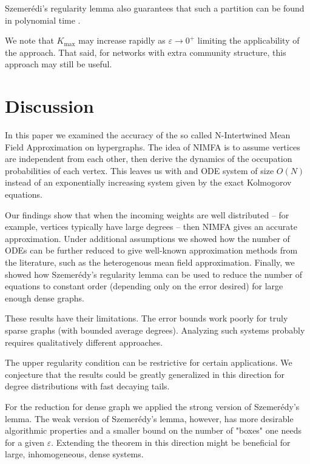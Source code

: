 \documentclass{article}
\newcommand{\1}[1]{{\mathds{1}}_{\left\{#1\right\}}}
\begin{document}
	Szemer\'edi's regularity lemma also guarantees that such a partition can be found in polynomial time \cite{SzemerediAlgorithm}.
	
	We note that $K_{\max}$ may increase rapidly as $\varepsilon \to 0^{+}$  limiting the applicability of the approach. That said, for networks with extra community structure, this approach may still be useful.
	
	\section{Discussion}
	\label{s:Discussion}
	
	
	In this paper we examined the accuracy of the so called N-Intertwined Mean Field Approximation on hypergraphs. The idea of NIMFA is to assume vertices are independent from each other, then derive the dynamics of the occupation probabilities of each vertex. This leaves us with and ODE system of size $O(N)$ instead of an exponentially increasing system given by the exact Kolmogorov equations.  
	
	Our findings show that when the incoming weights are well distributed -- for example, vertices typically have large degrees -- then NIMFA gives an accurate approximation. Under additional assumptions we showed how the number of ODEs can be further reduced to give well-known approximation methods from the literature, such as the heterogenous mean field approximation. Finally, we showed how Szemer\'edy's regularity lemma can be used to reduce the number of equations to constant order (depending only on the error desired) for large enough dense graphs.
	
	These results have their limitations. The error bounds work poorly for truly sparse graphs (with bounded average degrees). Analyzing such systems probably requires qualitatively different approaches.
	
	The upper regularity condition can be restrictive for certain applications. We conjecture that the results could be greatly generalized in this direction for degree distributions with fast decaying tails.

	For the reduction for dense graph we applied the strong version of Szemer\'edy's lemma. The weak version of Szemer\'edy's lemma, however, has more desirable algorithmic properties and a smaller bound on the number of "boxes" one needs for a given $\varepsilon$. Extending the theorem in this direction might be beneficial for large, inhomogeneous, dense systems.
	
\end{document}
